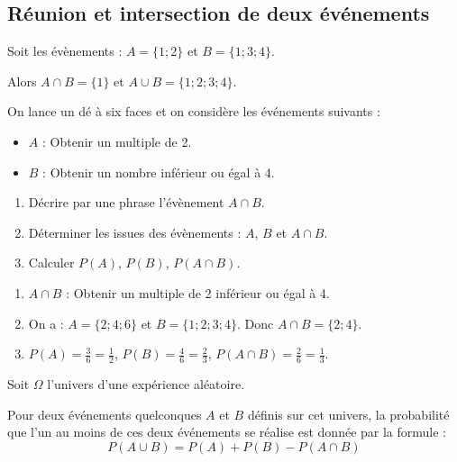 \subsection{Réunion et intersection de deux événements}

\begin{exemple}
	Soit les évènements : $A = \{1 ; 2\}$ et $B = \{1 ; 3 ; 4\}$.

	Alors $A \cap B = \{1\}$ et $A \cup B = \{1 ; 2 ; 3 ; 4\}$.
\end{exemple}

\begin{methode}
	On lance un dé à six faces et on considère les événements suivants :
	\begin{itemize}
		\item $A$ : \og{}Obtenir un multiple de 2\fg{}.
		\item $B$ : \og{}Obtenir un nombre inférieur ou égal à 4\fg{}.
	\end{itemize}
	\begin{enumerate}[label=\alph*)]
		\item Décrire par une phrase l'évènement $A \cap B$.
		\item Déterminer les issues des évènements : $A$, $B$ et $A \cap B$.
		\item Calculer $P(A)$, $P(B)$, $P(A \cap B)$.
	\end{enumerate}
\end{methode}

\begin{correction}
	\begin{enumerate}[label=\alph*)]
		\item $A \cap B$ : \og{}Obtenir un multiple de 2 inférieur ou égal à 4.\fg{}
		\item On a : $A = \{2 ; 4 ; 6\}$ et $B = \{1 ; 2 ; 3 ; 4\}$. Donc $A \cap B = \{2 ; 4\}$.
		\item $P(A) = \frac{3}{6} = \frac{1}{2}$, $P(B) = \frac{4}{6} = \frac{2}{3}$, $P(A \cap B) = \frac{2}{6} = \frac{1}{3}$.
	\end{enumerate}
\end{correction}


\begin{theoreme}
	Soit $\Omega$ l'univers d'une expérience aléatoire.

	Pour deux événements quelconques $A$ et $B$ définis sur cet univers, la probabilité que l'un au moins de ces deux événements se réalise est donnée par la formule :
	$$
		P(A \cup B) = P(A) + P(B) - P(A \cap B)
	$$
\end{theoreme}

